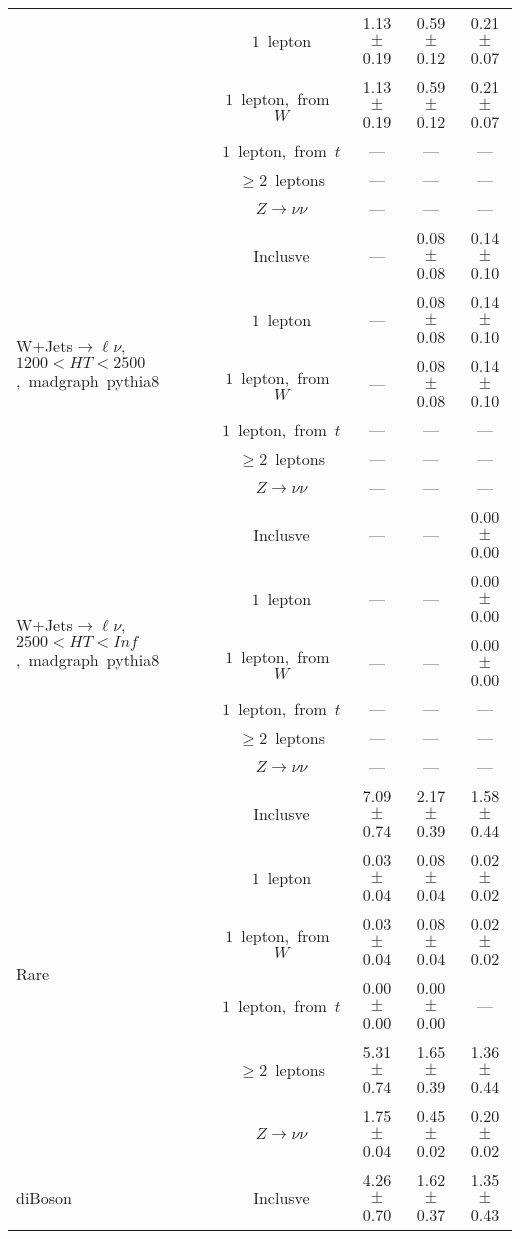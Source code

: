 \documentclass{article}
\begin{document}
\begin{longtable}{|l|c|c|c|c|}
 & $1$~lepton  & 1.13 $\pm$ 0.19  & 0.59 $\pm$ 0.12  & 0.21 $\pm$ 0.07 \\* 
 & $1$~lepton,~from~$W$  & 1.13 $\pm$ 0.19  & 0.59 $\pm$ 0.12  & 0.21 $\pm$ 0.07 \\* 
 & $1$~lepton,~from~$t$  & ---  & ---  & --- \\* 
 & $\ge2$~leptons  & ---  & ---  & --- \\* 
 & $Z\rightarrow\nu\nu$  & ---  & ---  & --- \\* 
\hline 
\multirow{6}{*}{W+Jets$\rightarrow\ell\nu$,~$1200<HT<2500$,~madgraph~pythia8} & Inclusve  & ---  & 0.08 $\pm$ 0.08  & 0.14 $\pm$ 0.10 \\* 
 & $1$~lepton  & ---  & 0.08 $\pm$ 0.08  & 0.14 $\pm$ 0.10 \\* 
 & $1$~lepton,~from~$W$  & ---  & 0.08 $\pm$ 0.08  & 0.14 $\pm$ 0.10 \\* 
 & $1$~lepton,~from~$t$  & ---  & ---  & --- \\* 
 & $\ge2$~leptons  & ---  & ---  & --- \\* 
 & $Z\rightarrow\nu\nu$  & ---  & ---  & --- \\* 
\hline 
\multirow{6}{*}{W+Jets$\rightarrow\ell\nu$,~$2500<HT<Inf$,~madgraph~pythia8} & Inclusve  & ---  & ---  & 0.00 $\pm$ 0.00 \\* 
 & $1$~lepton  & ---  & ---  & 0.00 $\pm$ 0.00 \\* 
 & $1$~lepton,~from~$W$  & ---  & ---  & 0.00 $\pm$ 0.00 \\* 
 & $1$~lepton,~from~$t$  & ---  & ---  & --- \\* 
 & $\ge2$~leptons  & ---  & ---  & --- \\* 
 & $Z\rightarrow\nu\nu$  & ---  & ---  & --- \\* 
\hline 
\multirow{6}{*}{Rare} & Inclusve  & 7.09 $\pm$ 0.74  & 2.17 $\pm$ 0.39  & 1.58 $\pm$ 0.44 \\* 
 & $1$~lepton  & 0.03 $\pm$ 0.04  & 0.08 $\pm$ 0.04  & 0.02 $\pm$ 0.02 \\* 
 & $1$~lepton,~from~$W$  & 0.03 $\pm$ 0.04  & 0.08 $\pm$ 0.04  & 0.02 $\pm$ 0.02 \\* 
 & $1$~lepton,~from~$t$  & 0.00 $\pm$ 0.00  & 0.00 $\pm$ 0.00  & --- \\* 
 & $\ge2$~leptons  & 5.31 $\pm$ 0.74  & 1.65 $\pm$ 0.39  & 1.36 $\pm$ 0.44 \\* 
 & $Z\rightarrow\nu\nu$  & 1.75 $\pm$ 0.04  & 0.45 $\pm$ 0.02  & 0.20 $\pm$ 0.02 \\* 
\hline 
\multirow{6}{*}{diBoson} & Inclusve  & 4.26 $\pm$ 0.70  & 1.62 $\pm$ 0.37  & 1.35 $\pm$ 0.43 \\* 

\end{longtable}
\end{document}
